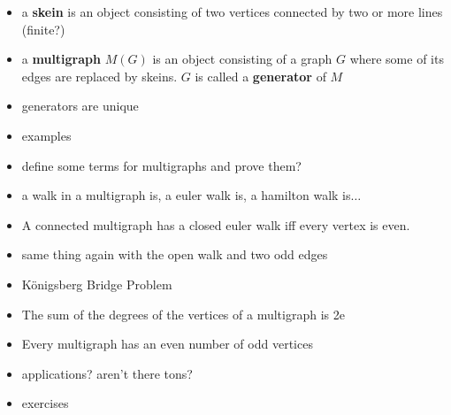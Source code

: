 \begin{itemize}
    \item a \textbf{skein} is an object consisting of two vertices connected by two or more lines (finite?)
    \item a \textbf{multigraph} $M(G)$ is an object consisting of a graph $G$ where some of its edges are replaced by skeins.  $G$ is called a \textbf{generator} of $M$
    \item generators are unique
    \item examples
    \item define some terms for multigraphs and prove them?
    \item a walk in a multigraph is, a euler walk is, a hamilton walk is$\ldots$
    \item A connected multigraph has a closed euler walk iff every vertex is even.
    \item same thing again with the open walk and two odd edges
    \item K\"{o}nigsberg Bridge Problem
    \item The sum of the degrees of the vertices of a multigraph is 2e
    \item Every multigraph has an even number of odd vertices
    \item applications?  aren't there tons?
    \item exercises
\end{itemize}
